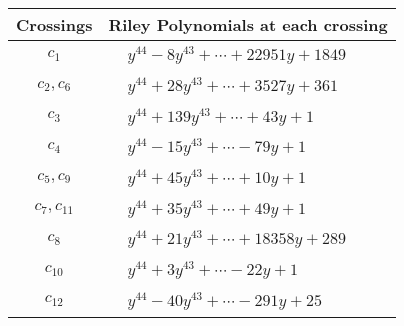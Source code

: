 \documentclass[1p]{elsarticle_modified}
\theoremstyle{definition}
\begin{document}
\begin{tabular}{m{50pt}|m{274pt}}
Crossings & \hspace{64pt}Riley Polynomials at each crossing \\
\hline $$\begin{aligned}c_{1}\end{aligned}$$&$\begin{aligned}
&y^{44}-8 y^{43}+\cdots+22951 y+1849
\end{aligned}$\\
\hline $$\begin{aligned}c_{2},c_{6}\end{aligned}$$&$\begin{aligned}
&y^{44}+28 y^{43}+\cdots+3527 y+361
\end{aligned}$\\
\hline $$\begin{aligned}c_{3}\end{aligned}$$&$\begin{aligned}
&y^{44}+139 y^{43}+\cdots+43 y+1
\end{aligned}$\\
\hline $$\begin{aligned}c_{4}\end{aligned}$$&$\begin{aligned}
&y^{44}-15 y^{43}+\cdots-79 y+1
\end{aligned}$\\
\hline $$\begin{aligned}c_{5},c_{9}\end{aligned}$$&$\begin{aligned}
&y^{44}+45 y^{43}+\cdots+10 y+1
\end{aligned}$\\
\hline $$\begin{aligned}c_{7},c_{11}\end{aligned}$$&$\begin{aligned}
&y^{44}+35 y^{43}+\cdots+49 y+1
\end{aligned}$\\
\hline $$\begin{aligned}c_{8}\end{aligned}$$&$\begin{aligned}
&y^{44}+21 y^{43}+\cdots+18358 y+289
\end{aligned}$\\
\hline $$\begin{aligned}c_{10}\end{aligned}$$&$\begin{aligned}
&y^{44}+3 y^{43}+\cdots-22 y+1
\end{aligned}$\\
\hline $$\begin{aligned}c_{12}\end{aligned}$$&$\begin{aligned}
&y^{44}-40 y^{43}+\cdots-291 y+25
\end{aligned}$\\
\hline
\end{tabular}\\~\\
\end{document}
